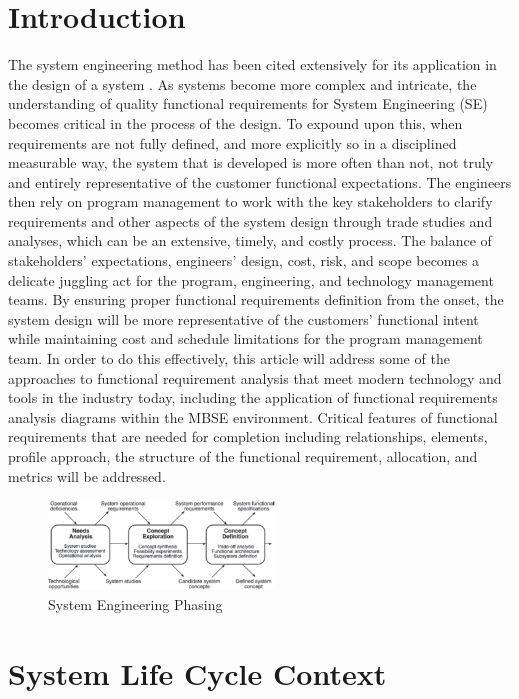 \documentclass[num-refs]{wiley-article}
\begin{document}
\section{Introduction}
\label{Introduction}
The system engineering method has been cited extensively for its application in the design of a system \cite{Friedenthal2008}. As systems become more complex and intricate, the understanding of quality functional requirements for System Engineering (SE) becomes critical in the process of the design. To expound upon this, when requirements are not fully defined, and more explicitly so in a disciplined measurable way, the system that is developed is more often than not, not truly and entirely representative of the customer functional expectations. The engineers then rely on program management to work with the key stakeholders to clarify requirements and other aspects of the system design through trade studies and analyses, which can be an extensive, timely, and costly process. The balance of stakeholders' expectations, engineers' design, cost, risk, and scope becomes a delicate juggling act for the program, engineering, and technology management teams. By ensuring proper functional requirements definition from the onset, the system design will be more representative of the customers' functional intent while maintaining cost and schedule limitations for the program management team. In order to do this effectively, this article will address some of the approaches to functional requirement analysis that meet modern technology and tools in the industry today, including the application of functional requirements analysis diagrams within the MBSE environment. Critical features of functional requirements that are needed for completion including relationships, elements, profile approach, the structure of the functional requirement, allocation, and metrics will be addressed.

\begin{figure}
\centering
\includegraphics[width=6cm]{Images/SystemEngineeringPhasing.png}
\caption{System Engineering Phasing \cite{Kossiakoff2011}}
\label{fig1}
\end{figure}

\section{System Life Cycle Context}
\label{System Life Cycle Context}
\end{document}
